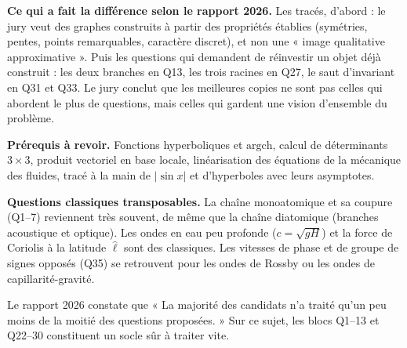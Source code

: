 \documentclass[11pt,a4paper]{article}
\begin{document}
\textbf{Ce qui a fait la différence selon le rapport 2026.} Les tracés, d'abord : le jury veut des graphes construits à partir des propriétés établies (symétries, pentes, points remarquables, caractère discret), et non une « image qualitative approximative ». Puis les questions qui demandent de réinvestir un objet déjà construit : les deux branches en Q13, les trois racines en Q27, le saut d'invariant en Q31 et Q33. Le jury conclut que les meilleures copies ne sont pas celles qui abordent le plus de questions, mais celles qui gardent une vision d'ensemble du problème.

\textbf{Prérequis à revoir.} Fonctions hyperboliques et \(\mathrm{argch}\), calcul de déterminants \(3\times3\), produit vectoriel en base locale, linéarisation des équations de la mécanique des fluides, tracé à la main de \(\lvert\sin x\rvert\) et d'hyperboles avec leurs asymptotes.

\textbf{Questions classiques transposables.} La chaîne monoatomique et sa coupure (Q1--7) reviennent très souvent, de même que la chaîne diatomique (branches acoustique et optique). Les ondes en eau peu profonde (\(c=\sqrt{gH}\)) et la force de Coriolis à la latitude \(\hat\ell\) sont des classiques. Les vitesses de phase et de groupe de signes opposés (Q35) se retrouvent pour les ondes de Rossby ou les ondes de capillarité-gravité.

Le rapport 2026 constate que « La majorité des candidats n'a traité qu'un peu moins de la moitié des questions proposées. » Sur ce sujet, les blocs Q1--13 et Q22--30 constituent un socle sûr à traiter vite.
\end{document}
